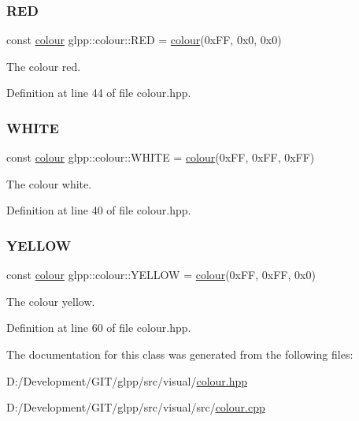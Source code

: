 \subsubsection{\texorpdfstring{R\+ED}{RED}}
{\footnotesize\ttfamily const \hyperlink{classglpp_1_1colour}{colour} glpp\+::colour\+::\+R\+ED = \hyperlink{classglpp_1_1colour}{colour}(0x\+F\+F, 0x0, 0x0)\hspace{0.3cm}{\ttfamily [static]}}

The colour red. 

Definition at line 44 of file colour.\+hpp.

\mbox{\label{classglpp_1_1colour_a31dee30a00a739220ec67ece4e91b028}} 
\subsubsection{\texorpdfstring{W\+H\+I\+TE}{WHITE}}
{\footnotesize\ttfamily const \hyperlink{classglpp_1_1colour}{colour} glpp\+::colour\+::\+W\+H\+I\+TE = \hyperlink{classglpp_1_1colour}{colour}(0x\+F\+F, 0x\+F\+F, 0x\+F\+F)\hspace{0.3cm}{\ttfamily [static]}}

The colour white. 

Definition at line 40 of file colour.\+hpp.

\mbox{\label{classglpp_1_1colour_a2b8d287c0ff80c6b11dcf4d7bcca4bce}} 
\subsubsection{\texorpdfstring{Y\+E\+L\+L\+OW}{YELLOW}}
{\footnotesize\ttfamily const \hyperlink{classglpp_1_1colour}{colour} glpp\+::colour\+::\+Y\+E\+L\+L\+OW = \hyperlink{classglpp_1_1colour}{colour}(0x\+F\+F, 0x\+F\+F, 0x0)\hspace{0.3cm}{\ttfamily [static]}}

The colour yellow. 

Definition at line 60 of file colour.\+hpp.



The documentation for this class was generated from the following files\+:\begin{DoxyCompactItemize}
\item 
D\+:/\+Development/\+G\+I\+T/glpp/src/visual/\hyperlink{colour_8hpp}{colour.\+hpp}\item 
D\+:/\+Development/\+G\+I\+T/glpp/src/visual/src/\hyperlink{colour_8cpp}{colour.\+cpp}\end{DoxyCompactItemize}

